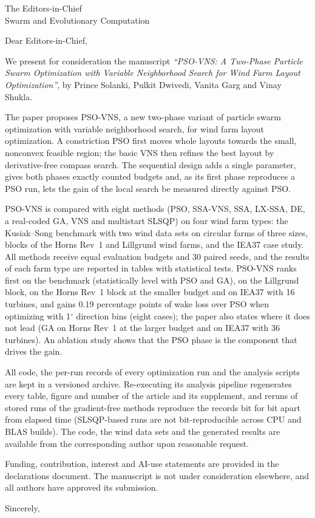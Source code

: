 \documentclass[11pt]{letter}
\date{\today}
\begin{document}
\pagestyle{empty}
\begin{letter}{The Editors-in-Chief\\Swarm and Evolutionary Computation}
\opening{Dear Editors-in-Chief,}
We present for consideration the manuscript \textit{``PSO-VNS: A Two-Phase Particle Swarm Optimization with Variable Neighborhood Search for Wind Farm Layout Optimization''}, by Prince Solanki, Pulkit Dwivedi, Vanita Garg and Vinay Shukla.

The paper proposes PSO-VNS, a new two-phase variant of particle swarm optimization with variable neighborhood search, for wind farm layout optimization. A constriction PSO first moves whole layouts towards the small, nonconvex feasible region; the basic VNS then refines the best layout by derivative-free compass search. The sequential design adds a single parameter, gives both phases exactly counted budgets and, as its first phase reproduces a PSO run, lets the gain of the local search be measured directly against PSO.

PSO-VNS is compared with eight methods (PSO, SSA-VNS, SSA, LX-SSA, DE, a real-coded GA, VNS and multistart SLSQP) on four wind farm types: the Kusiak--Song benchmark with two wind data sets on circular farms of three sizes, blocks of the Horns Rev~1 and Lillgrund wind farms, and the IEA37 case study. All methods receive equal evaluation budgets and 30 paired seeds, and the results of each farm type are reported in tables with statistical tests. PSO-VNS ranks first on the benchmark (statistically level with PSO and GA), on the Lillgrund block, on the Horns Rev~1 block at the smaller budget and on IEA37 with 16 turbines, and gains 0.19 percentage points of wake loss over PSO when optimizing with 1$^\circ$ direction bins (eight cases); the paper also states where it does not lead (GA on Horns Rev~1 at the larger budget and on IEA37 with 36 turbines). An ablation study shows that the PSO phase is the component that drives the gain.

All code, the per-run records of every optimization run and the analysis scripts are kept in a versioned archive. Re-executing its analysis pipeline regenerates every table, figure and number of the article and its supplement, and reruns of stored runs of the gradient-free methods reproduce the records bit for bit apart from elapsed time (SLSQP-based runs are not bit-reproducible across CPU and BLAS builds). The code, the wind data sets and the generated results are available from the corresponding author upon reasonable request.

Funding, contribution, interest and AI-use statements are provided in the declarations document. The manuscript is not under consideration elsewhere, and all authors have approved its submission.

\closing{Sincerely,}
\end{letter}
\end{document}
